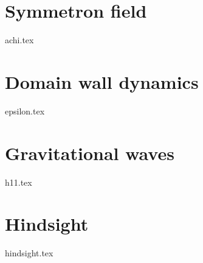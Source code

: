 










\section{Symmetron field}\label{sec:results:achi}
    {{achi.tex}}


\section{Domain wall dynamics}\label{sec:results:epsilon}
    {{epsilon.tex}}

\section{Gravitational waves}\label{sec:results:h11}
    {{h11.tex}}


\section{Hindsight}\label{sec:results:hindsight}
    {{hindsight.tex}}



